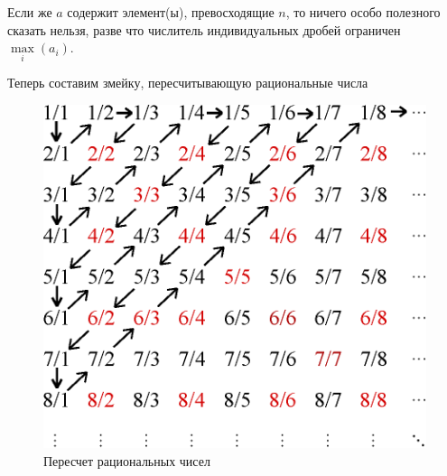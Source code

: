 \begin{solution}
\begin{upd}
        Если же $a$ содержит элемент(ы), превосходящие $n$, то ничего особо полезного сказать нельзя, разве что числитель индивидуальных дробей ограничен $\max\limits_i(a_i)$.
        
        Теперь составим змейку, пересчитывающую рациональные числа
        \begin{figure}[H]
            \centering
            \includegraphics[scale=0.7]{pics/Diagonal_argument.eps}
            \caption{Пересчет рациональных чисел}
        \end{figure}


\end{upd}
\end{solution}
